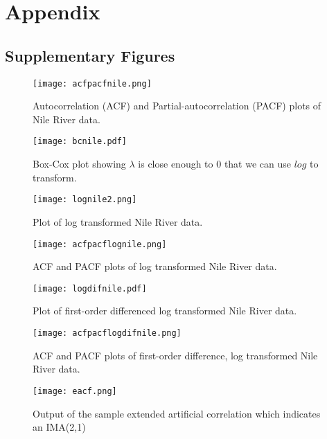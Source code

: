 \documentclass{article}
\begin{document}
\section{Appendix}
\subsection{Supplementary Figures}
\begin{figure}[H]
\begin{center}
\texttt{[image: acfpacfnile.png]}
\caption{Autocorrelation (ACF) and Partial-autocorrelation (PACF) plots of Nile River data.}
\end{center}
\end{figure}
\begin{figure}[H]
\begin{center}
\texttt{[image: bcnile.pdf]}
\caption{Box-Cox plot showing $\lambda$ is close enough to 0 that we can use $log$ to transform.}
\end{center}
\end{figure}
\begin{figure}[H]
\begin{center}
\texttt{[image: lognile2.png]}
\caption{Plot of log transformed Nile River data.}
\end{center}
\end{figure}
\begin{figure}[H]
\begin{center}
\texttt{[image: acfpacflognile.png]}
\caption{ACF and PACF plots of log transformed Nile River data.}
\end{center}
\end{figure}
\begin{figure}[H]
\begin{center}
\texttt{[image: logdifnile.pdf]}
\caption{Plot of first-order differenced log transformed Nile River data.}
\end{center}
\end{figure}
\begin{figure}[H]
\begin{center}
\texttt{[image: acfpacflogdifnile.png]}
\caption{ACF and PACF plots of first-order difference, log transformed Nile River data.}
\end{center}
\end{figure}
\begin{figure}[H]
\begin{center}
\texttt{[image: eacf.png]}
\caption{Output of the sample extended artificial correlation which indicates an IMA(2,1)}
\end{center}
\end{figure}
\end{document}

